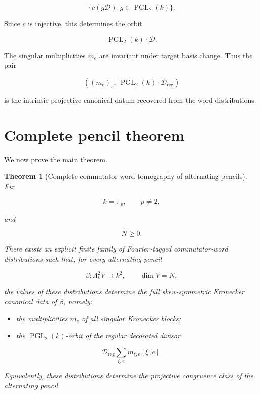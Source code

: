 \documentclass[11pt]{article}
\newtheorem{theorem}{Theorem}[section]
\begin{document}
\[
\{c(g\mathcal D):g\in \operatorname{PGL}_2(k)\}.
\]

Since $c$ is injective, this determines the orbit

\[
\operatorname{PGL}_2(k)\cdot\mathcal D.
\]

The singular multiplicities $m_e$ are invariant under target basis change. Thus the pair

\[
\left((m_e)_e,\ \operatorname{PGL}_2(k)\cdot\mathcal D_{\mathrm{reg}}\right)
\]

is the intrinsic projective canonical datum recovered from the word distributions.

\section{Complete pencil theorem}

We now prove the main theorem.

\begin{theorem}[Complete commutator-word tomography of alternating pencils]

Fix

\[
k=\mathbb F_p,\qquad p\neq2,
\]

and

\[
N\ge0.
\]

There exists an explicit finite family of Fourier-tagged commutator-word distributions such that, for every alternating pencil

\[
\beta:\Lambda^2_k V\to k^2,
\qquad
\dim V=N,
\]

the values of these distributions determine the full skew-symmetric Kronecker canonical data of $\beta$, namely:

\begin{itemize}
\item the multiplicities $m_e$ of all singular Kronecker blocks;
\end{itemize}

\begin{itemize}
\item the $\operatorname{PGL}_2(k)$-orbit of the regular decorated divisor
\end{itemize}

\[
\mathcal D_{\mathrm{reg}}\sum_{\xi,e}m_{\xi,e}[\xi,e].
\]

Equivalently, these distributions determine the projective congruence class of the alternating pencil.

\end{theorem}
\end{document}
